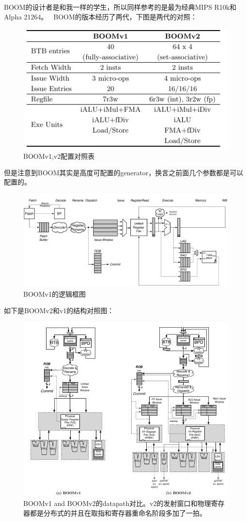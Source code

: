 \documentclass{article}
\begin{document}
	BOOM的设计者是和我一样的学生，所以同样参考的是最为经典MIPS R10k和Alpha 21264。~\cite{Celio:EECS-2017-157}
	BOOM的版本经历了两代，下图是两代的对照：
	\begin{figure}[H]
		\centering
		\includegraphics[width=0.4\linewidth]{figs/BOOMv1v2.png}	
		\captionsetup{labelformat=empty}
		\caption{BOOMv1,v2配置对照表~\cite{Celio:EECS-2017-157}}
	\end{figure}		
	但是注意到BOOM其实是高度可配置的generator，换言之前面几个参数都是可以配置的。
	\begin{figure}[H]
		\centering
		\includegraphics[width=0.73\linewidth]{figs/BOOM.png}
		\captionsetup{labelformat=empty}
		\caption{BOOMv1的逻辑框图~\cite{Celio:EECS-2017-157}}	
	\end{figure}
	如下是BOOMv2和v1的结构对照图：
	\begin{figure}[H]
		\includegraphics[width=0.9\linewidth]{figs/Boomv1v2.png}
		\captionsetup{labelformat=empty}
		\caption{BOOMv1 and BOOMv2的datapath对比。v2的发射窗口和物理寄存器都是分布式的并且在取指和寄存器重命名阶段多加了一拍。~\cite{Celio:EECS-2017-157}}	
	\end{figure}
\end{document}

